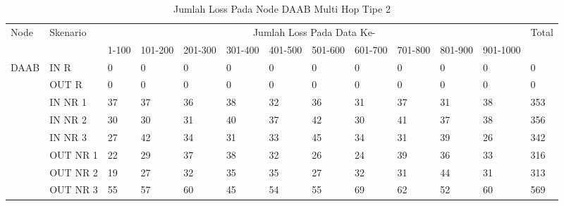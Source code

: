 \begin{table}[H]
  \centering
  \caption{Jumlah Loss Pada Node DAAB Multi Hop Tipe 2}
    \begin{tabular}{|p{1cm}|p{1.9cm}|p{0.6cm}|p{0.6cm}|p{0.6cm}|p{0.6cm}|p{0.6cm}|p{0.6cm}|p{0.6cm}|p{0.6cm}|p{0.6cm}|p{0.6cm}|p{1cm}|}
    \hline
        \multirow{2}{*}{Node}&\multirow{2}{*}{Skenario}&\multicolumn{10}{|c|}{Jumlah Loss Pada Data Ke-}&\multirow{2}{*}{Total} \\\cline{3-12}
          & & 1-100 & 101-200 & 201-300 & 301-400 & 401-500 & 501-600 & 601-700 & 701-800 & 801-900 & 901-1000 & \\
        \hline
    \multirow{8}{*}{DAAB}  
          & IN R  & 0     & 0     & 0     & 0     & 0     & 0     & 0     & 0     & 0     & 0     & 0 \\
          & OUT R & 0     & 0     & 0     & 0     & 0     & 0     & 0     & 0     & 0     & 0     & 0 \\
          & IN NR 1 & 37    & 37    & 36    & 38    & 32    & 36    & 31    & 37    & 31    & 38    & 353 \\
          & IN NR 2 & 30    & 30    & 31    & 40    & 37    & 42    & 30    & 41    & 37    & 38    & 356 \\
          & IN NR 3 & 27    & 42    & 34    & 31    & 33    & 45    & 34    & 31    & 39    & 26    & 342 \\
          & OUT NR 1 & 22    & 29    & 37    & 38    & 32    & 26    & 24    & 39    & 36    & 33    & 316 \\
          & OUT NR 2 & 19    & 27    & 32    & 35    & 35    & 27    & 32    & 31    & 44    & 31    & 313 \\
          & OUT NR 3 & 55    & 57    & 60    & 45    & 54    & 55    & 69    & 62    & 52    & 60    & 569 \\
    
    \hline
    \end{tabular}%
  \label{tab:addlabel}%
\end{table}%

